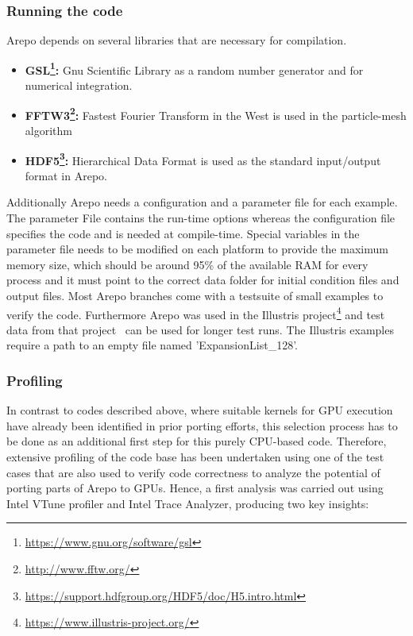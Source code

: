 \documentclass[../main]{subfiles}
\begin{document}
\subsubsection{Running the code}
Arepo depends on several libraries that are necessary for compilation. 
    \begin{itemize}
        \item{\textbf{GSL\footnote{\url{https://www.gnu.org/software/gsl}}:}} Gnu Scientific Library as a random number generator and for numerical integration.
        \item{\textbf{FFTW3\footnote{\url{http://www.fftw.org/}}:}} Fastest Fourier Transform in the West is used in the particle-mesh algorithm
        \item{\textbf{HDF5\footnote{\url{https://support.hdfgroup.org/HDF5/doc/H5.intro.html}}:}} Hierarchical Data Format is used as the standard input/output format in Arepo. 
    \end{itemize}
Additionally Arepo needs a configuration and a parameter file for each example. The parameter File contains the run-time options whereas the configuration file specifies the code and is needed at compile-time. Special variables in the parameter file needs to be modified on each platform to provide the maximum memory size, which should be around 95\% of the available RAM for every process and it must point to the correct data folder for initial condition files and output files. Most Arepo branches come with a testsuite of small examples to verify the code. Furthermore Arepo was used in the Illustris project\footnote{\url{https://www.illustris-project.org/}} and test data from that project~\cite{Nelson_2015} can be used for longer test runs. The Illustris examples require a path to an empty file named 'ExpansionList\_128'. 

\subsubsection{Profiling}
In contrast to codes described above, where suitable kernels for GPU execution have already been identified in prior porting efforts, this selection process has to be done as an additional first step for this purely CPU-based code.
Therefore, extensive profiling of the code base has been undertaken using one of the test cases that are also used to verify code correctness to analyze the potential of porting parts of Arepo to GPUs.
Hence, a first analysis was carried out using Intel VTune profiler and Intel Trace Analyzer, producing two key insights:
\end{document}

